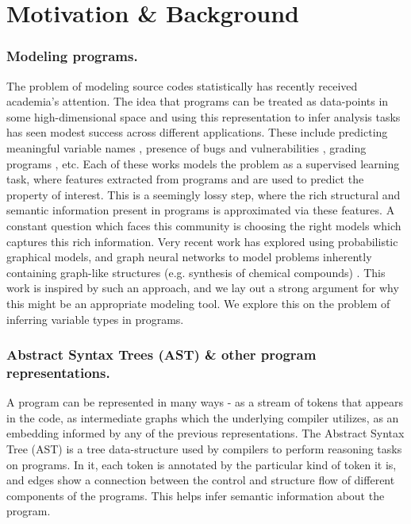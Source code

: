 \section{Motivation \& Background}
\label{sec:motivation}

\subsubsection{Modeling programs.} The problem of modeling source codes statistically has recently received academia's attention. The idea that programs can be treated as data-points in some high-dimensional space and using this representation to infer analysis tasks has seen modest success across different applications. These include predicting meaningful variable names \cite{bigcode}, presence of bugs and vulnerabilities \cite{bugs}, grading programs \cite{ss}, etc. Each of these works models the problem as a supervised learning task, where features extracted from programs and are used to predict the property of interest. This is a seemingly lossy step, where the rich structural and semantic information present in programs is approximated via these features. A constant question which faces this community is choosing the right models which captures this rich information. Very recent work has explored using probabilistic graphical models, and graph neural networks to model problems inherently containing graph-like structures (e.g. synthesis of chemical compounds) \cite{chemnips}. This work is inspired by such an approach, and we lay out a strong argument for why this might be an appropriate modeling tool. We explore this on the problem of inferring variable types in programs.

\subsubsection{Abstract Syntax Trees (AST) \& other program representations.} A program can be represented in many ways - as a stream of tokens that appears in the code, as intermediate graphs which the underlying compiler utilizes, as an embedding informed by any of the previous representations. The Abstract Syntax Tree (AST) is a tree data-structure used by compilers to perform reasoning tasks on programs.  In it, each token is annotated by the particular kind of token it is, and edges show a connection between the control and structure flow of different components of the programs. This helps infer semantic information about the program.

